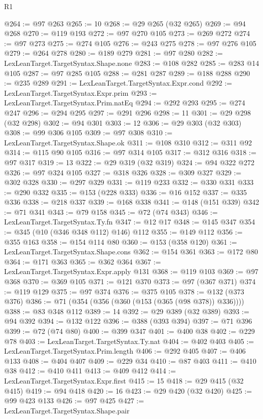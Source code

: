 \begin{lexlean}{R1}
\begin{coremodule}
{{{{{{{{{{{{{{{{{{{{{{{{{{{{{{{{{{{{{{{{{{{{{{{{{{{{{{{{{{{{{{{{{{{{{{{{{{{{{{{{{{{{{{{{{{{{{{{{{{{{{{{{{{{{{{{{{{{{{{{{{{{{{{{{{{{{{{{{{{{{{{{{{{{{{{{{{{{{{{{{{{{{{{{{{{{{{{{{{{{{{{{{{{@264 := @97 @263
@265 := 10
@268 := @29 @265 (@32 @265)
@269 := @94 @268
@270 := @119 @193
@272 := @97 @270 @105
@273 := @269 @272
@274 := @97 @273
@275 := @274 @105
@276 := @243 @275
@278 := @97 @276 @105
@279 := @264 @278
@280 := @189 @279
@281 := @97 @280
@282 := LexLeanTarget.TargetSyntax.Shape.none
@283 := @108 @282
@285 := @283 @14 @105
@287 := @97 @285 @105
@288 := @281 @287
@289 := @188 @288
@290 := @235 @289
@291 := LexLeanTarget.TargetSyntax.Expr.cond
@292 := LexLeanTarget.TargetSyntax.Expr.prim
@293 := LexLeanTarget.TargetSyntax.Prim.natEq
@294 := @292 @293
@295 := @274 @247
@296 := @294 @295
@297 := @291 @296
@298 := 11
@301 := @29 @298 (@32 @298)
@302 := @94 @301
@303 := 12
@306 := @29 @303 (@32 @303)
@308 := @99 @306 @105
@309 := @97 @308
@310 := LexLeanTarget.TargetSyntax.Shape.ok
@311 := @108 @310
@312 := @311 @92
@314 := @115 @90 @105
@316 := @97 @314 @105
@317 := @312 @316
@318 := @97 @317
@319 := 13
@322 := @29 @319 (@32 @319)
@324 := @94 @322 @272
@326 := @97 @324 @105
@327 := @318 @326
@328 := @309 @327
@329 := @302 @328
@330 := @297 @329
@331 := @119 @233
@332 := @330 @331
@333 := @290 @332
@335 := @153 (@228 @333)
@336 := @16 @152
@337 := @335 @336
@338 := @218 @337
@339 := @168 @338
@341 := @148 (@151 @339)
@342 := @71 @341
@343 := @79 @158
@345 := @72 (@74 @343)
@346 := LexLeanTarget.TargetSyntax.Ty.fn
@347 := @12 @17
@348 := @145 @347
@354 := @345 (@10 (@346 @348 @112) @146) @112
@355 := @149 @112
@356 := @355 @163
@358 := @154 @114 @80
@360 := @153 (@358 @120)
@361 := LexLeanTarget.TargetSyntax.Shape.cons
@362 := @154 @361
@363 := @172 @80
@364 := @171 @363
@365 := @362 @364
@367 := LexLeanTarget.TargetSyntax.Expr.apply @131
@368 := @119 @103
@369 := @97 @368
@370 := @369 @105
@371 := @121 @370
@373 := @97 (@367 @371)
@374 := @119 @129
@375 := @97 @374
@376 := @375 @105
@378 := @132 (@373 @376)
@386 := @71 (@354 (@356 (@360 (@153 (@365 (@98 @378)) @336))))
@388 := @83 @348 @112
@389 := 14
@392 := @29 @389 (@32 @389)
@393 := @94 @392
@394 := @132 @122
@396 := @388 (@393 @394)
@397 := @71 @396
@399 := @72 (@74 @80)
@400 := @399 @347
@401 := @400 @38
@402 := @229 @78
@403 := LexLeanTarget.TargetSyntax.Ty.nat
@404 := @402 @403
@405 := LexLeanTarget.TargetSyntax.Prim.length
@406 := @292 @405
@407 := @406 @133
@408 := @404 @407
@409 := @229 @34
@410 := @87 @403
@411 := @410 @38
@412 := @410 @411
@413 := @409 @412
@414 := LexLeanTarget.TargetSyntax.Expr.first
@415 := 15
@418 := @29 @415 (@32 @415)
@419 := @94 @418
@420 := 16
@423 := @29 @420 (@32 @420)
@425 := @99 @423 @133
@426 := @97 @425
@427 := LexLeanTarget.TargetSyntax.Shape.pair
}}}}}}}}}}}}}}}}}}}}}}}}}}}}}}}}}}}}}}}}}}}}}}}}}}}}}}}}}}}}}}}}}}}}}}}}}}}}}}}}}}}}}}}}}}}}}}}}}}}}}}}}}}}}}}}}}}}}}}}}}}}}}}}}}}}}}}}}}}}}}}}}}}}}}}}}}}}}}}}}}}}}}}}}}}}}}}}}}}}}}}}}}}
\end{coremodule}
\end{lexlean}
